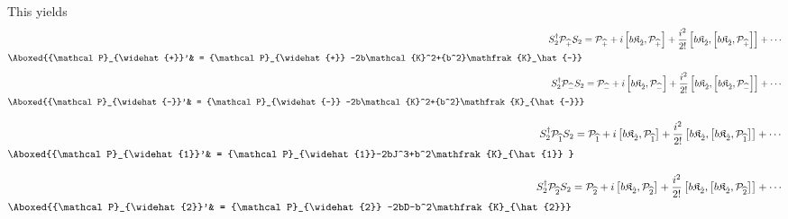 \documentclass[]{article}
\numberwithin{equation}{section}
\def\wh{\widehat}
\begin{document}
{{%
This yields
\begin{align}
S_2^{\dagger} {\mathcal P}_{\wh{+}}S_2 & = {\mathcal P}_{\wh{+}} + i\left[b\mathfrak{K}_{\hat{2}}, {\mathcal P}_{\wh{+}} \right] + \frac{i^2}{2!}\left[b\mathfrak{K}_{\hat{2}}, \left[b\mathfrak{K}_{\hat{2}}, {\mathcal P}_{\wh{+}} \right]\right] + \cdots \\ %
\Aboxed{{\mathcal P}_{\wh{+}}'& = {\mathcal P}_{\wh{+}} -2b\mathcal{K}^2+{b^2}\mathfrak{K}_\hat{-}} 
\end{align}
\begin{align}
S_2^{\dagger} {\mathcal P}_{\wh{-}}S_2 & = {\mathcal P}_{\wh{-}} + i\left[b\mathfrak{K}_{\hat{2}}, {\mathcal P}_{\wh{-}} \right] + \frac{i^2}{2!}\left[b\mathfrak{K}_{\hat{2}}, \left[b\mathfrak{K}_{\hat{2}}, {\mathcal P}_{\wh{-}} \right]\right] + \cdots \\ %
\Aboxed{{\mathcal P}_{\wh{-}}'& = {\mathcal P}_{\wh{-}} -2b\mathcal{K}^2+{b^2}\mathfrak{K}_{\hat{-}}} 
\end{align}

\begin{align}
S_2^{\dagger} {\mathcal P}_{\wh{1}}S_2 & = {\mathcal P}_{\wh{1}} + i\left[b\mathfrak{K}_{\hat{2}}, {\mathcal P}_{\wh{1}} \right] + \frac{i^2}{2!}\left[b\mathfrak{K}_{\hat{2}}, \left[b\mathfrak{K}_{\hat{2}}, {\mathcal P}_{\wh{1}} \right]\right] + \cdots \\ %
\Aboxed{{\mathcal P}_{\wh{1}}'& = {\mathcal P}_{\wh{1}}-2bJ^3+b^2\mathfrak{K}_{\hat{1}} } 
\end{align}


\begin{align}
S_2^{\dagger} {\mathcal P}_{\wh{2}}S_2 & = {\mathcal P}_{\wh{2}} + i\left[b\mathfrak{K}_{\hat{2}}, {\mathcal P}_{\wh{2}} \right] + \frac{i^2}{2!}\left[b\mathfrak{K}_{\hat{2}}, \left[b\mathfrak{K}_{\hat{2}}, {\mathcal P}_{\wh{2}} \right]\right] + \cdots \\ %
\Aboxed{{\mathcal P}_{\wh{2}}'& = {\mathcal P}_{\wh{2}} -2bD-b^2\mathfrak{K}_{\hat{2}}} 
\end{align}

}}
\end{document}
